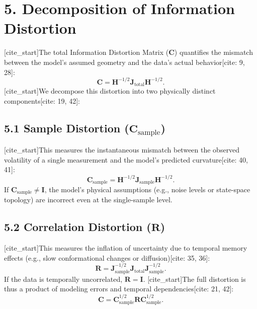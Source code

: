 \documentclass[11pt]{article}
\begin{document}
\section*{5. Decomposition of Information Distortion}
[cite_start]The total Information Distortion Matrix ($\mathbf{C}$) quantifies the mismatch between the model's assumed geometry and the data's actual behavior[cite: 9, 28]:
\begin{equation}
\mathbf{C} = \mathbf{H}^{-1/2} \mathbf{J}_{\mathrm{total}} \mathbf{H}^{-1/2}.
\end{equation}
[cite_start]We decompose this distortion into two physically distinct components[cite: 19, 42]:

\subsection*{5.1 Sample Distortion ($\mathbf{C}_{\mathrm{sample}}$)}
[cite_start]This measures the instantaneous mismatch between the observed volatility of a single measurement and the model's predicted curvature[cite: 40, 41]:
\begin{equation}
\mathbf{C}_{\mathrm{sample}} = \mathbf{H}^{-1/2} \mathbf{J}_{\mathrm{sample}} \mathbf{H}^{-1/2}.
\end{equation}
If $\mathbf{C}_{\mathrm{sample}} \neq \mathbf{I}$, the model's physical assumptions (e.g., noise levels or state-space topology) are incorrect even at the single-sample level.

\subsection*{5.2 Correlation Distortion ($\mathbf{R}$)}
[cite_start]This measures the inflation of uncertainty due to temporal memory effects (e.g., slow conformational changes or diffusion)[cite: 35, 36]:
\begin{equation}
\mathbf{R} = \mathbf{J}_{\mathrm{sample}}^{-1/2} \mathbf{J}_{\mathrm{total}} \mathbf{J}_{\mathrm{sample}}^{-1/2}.
\end{equation}
If the data is temporally uncorrelated, $\mathbf{R} = \mathbf{I}$. [cite_start]The full distortion is thus a product of modeling errors and temporal dependencies[cite: 21, 42]:
\begin{equation}
\mathbf{C} = \mathbf{C}_{\mathrm{sample}}^{1/2} \mathbf{R} \mathbf{C}_{\mathrm{sample}}^{1/2}.
\end{equation}
\end{document}
